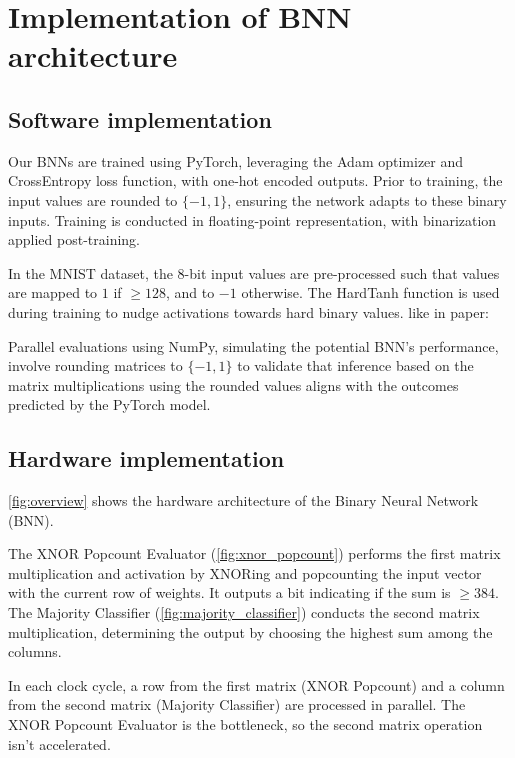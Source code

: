 \documentclass[conference]{IEEEtran}
\newcounter{todocount}
\newcommand{\todo}[1]{
  \stepcounter{todocount}
}
\begin{document}
\section{Implementation of BNN architecture}
\label{sec:implementation}
\subsection{Software implementation}
\todo{list learning rate, batch size}

Our BNNs are trained using PyTorch\cite{paszke2019pytorch}, leveraging the Adam optimizer\cite{kingma2014adam} and CrossEntropy loss function\cite{mao2023crossentropy}, with one-hot encoded outputs. Prior to training, the input values are rounded to \(\{-1, 1\}\), ensuring the network adapts to these binary inputs. Training is conducted in floating-point representation, with binarization applied post-training.

In the MNIST dataset, the 8-bit input values are pre-processed such that values are mapped to $1$ if $\geq 128$, and to $-1$ otherwise. The HardTanh function is used during training to nudge activations towards hard binary values. like in paper: \cite{yuan2023comprehensive}

Parallel evaluations using NumPy, simulating the potential BNN's performance, involve rounding matrices to \(\{-1, 1\}\) to validate that inference based on the matrix multiplications using the rounded values aligns with the outcomes predicted by the PyTorch model.



\subsection{Hardware implementation}

\autoref{fig:overview} shows the hardware architecture of the Binary Neural Network (BNN). 

The XNOR Popcount Evaluator (\autoref{fig:xnor_popcount}) performs the first matrix multiplication and activation by XNORing and popcounting the input vector with the current row of weights. It outputs a bit indicating if the sum is $\geq 384$. The Majority Classifier (\autoref{fig:majority_classifier}) conducts the second matrix multiplication, determining the output by choosing the highest sum among the columns.

In each clock cycle, a row from the first matrix (XNOR Popcount) and a column from the second matrix (Majority Classifier) are processed in parallel. The XNOR Popcount Evaluator is the bottleneck, so the second matrix operation isn't accelerated. 
\end{document}
